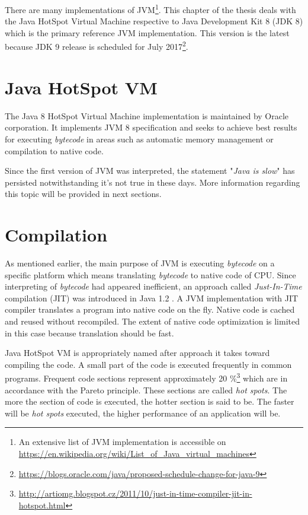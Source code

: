 \documentclass[
  digital, %
  oneside,
  notable, %
  nolof,     %
  nolot     %
]{fithesis3}
\begin{document}
There are many implementations of JVM\footnote{An extensive list of JVM implementation is accessible on \url{https://en.wikipedia.org/wiki/List_of_Java_virtual_machines}}. This chapter of the thesis deals with the Java HotSpot Virtual Machine respective to Java Development Kit 8 (JDK 8) which is the primary reference JVM implementation. This version is the latest because JDK 9 release is scheduled for July 2017\footnote{\url{https://blogs.oracle.com/java/proposed-schedule-change-for-java-9}}.

\section{Java HotSpot VM}
The Java 8 HotSpot Virtual Machine implementation is maintained by Oracle corporation. It implements JVM 8 specification and seeks to achieve best results for executing \textit{bytecode} in areas such as automatic memory management or compilation to native code.

Since the first version of JVM was interpreted, the statement "\textit{Java is slow}" has persisted notwithstanding it's not true in these days. More information regarding this topic will be provided in next sections.

\section{Compilation}

As mentioned earlier, the main purpose of JVM is executing \textit{bytecode} on a specific platform which means translating \textit{bytecode} to native code of CPU. Since interpreting of \textit{bytecode} had appeared inefficient, an approach called \textit{Just-In-Time} compilation (JIT) was introduced in Java 1.2 \cite{javavsc}. A JVM implementation with JIT compiler translates a program into native code on the fly. Native code is cached and reused without recompiled. The extent of native code optimization is limited in this case because translation should be fast.

Java HotSpot VM is appropriately named after approach it takes toward compiling the code. A small part of the code is executed frequently in common programs. Frequent code sections represent approximately 20 \%\footnote{\url{http://artiomg.blogspot.cz/2011/10/just-in-time-compiler-jit-in-hotspot.html}} which are in accordance with the Pareto principle. These sections are called \textit{hot spots}. The more the section of code is executed, the hotter section is said to be. The faster will be \textit{hot spots} executed, the higher performance of an application will be. \cite{scott}
\end{document}
